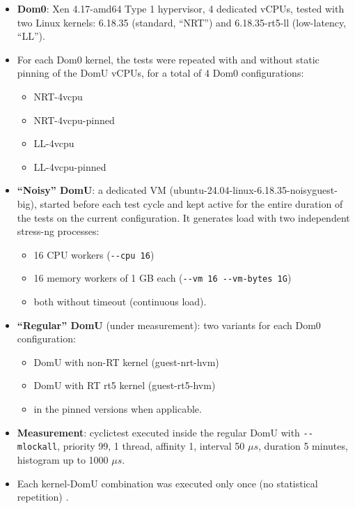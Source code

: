 \begin{itemize}
\item
  \textbf{Dom0}: Xen 4.17-amd64 Type 1 hypervisor, 4 dedicated vCPUs,
  tested with two Linux kernels: 6.18.35 (standard, ``NRT'') and
  6.18.35-rt5-ll (low-latency, ``LL'').
\item
  For each Dom0 kernel, the tests were repeated with and without static
  pinning of the DomU vCPUs, for a total of 4 Dom0 configurations:

  \begin{itemize}
  \item
    NRT-4vcpu
  \item
    NRT-4vcpu-pinned
  \item
    LL-4vcpu
  \item
    LL-4vcpu-pinned
  \end{itemize}
\item
  \textbf{``Noisy'' DomU}: a dedicated VM
  (ubuntu-24.04-linux-6.18.35-noisyguest-big), started before each test
  cycle and kept active for the entire duration of the tests on the
  current configuration. It generates load with two independent
  stress-ng processes:

  \begin{itemize}
  \item
    16 CPU workers (\texttt{-\/-cpu\ 16})
  \item
    16 memory workers of 1 GB each
    (\texttt{-\/-vm\ 16\ -\/-vm-bytes\ 1G})
  \item
    both without timeout (continuous load).
  \end{itemize}
\item
  \textbf{``Regular'' DomU} (under measurement): two variants for each
  Dom0 configuration:

  \begin{itemize}
  \item
    DomU with non-RT kernel (guest-nrt-hvm)
  \item
    DomU with RT rt5 kernel (guest-rt5-hvm)
  \item
    in the pinned versions when applicable.
  \end{itemize}
\item
  \textbf{Measurement}: cyclictest executed inside the regular DomU with
  \texttt{-\/-mlockall}, priority 99, 1 thread, affinity 1, interval 50
  $\mu s$, duration 5 minutes, histogram up to 1000 $\mu s$.
\item
  Each kernel-DomU combination was executed only once (no statistical
  repetition) .
\end{itemize}

